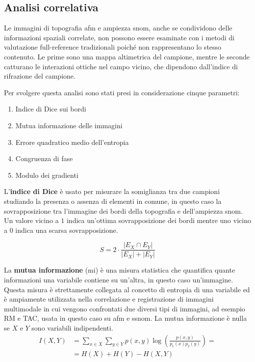 \documentclass[../main.tex]{subfiles}
\begin{document}
\subsection{Analisi correlativa}

Le immagini di topografia \acrshort{afm} e ampiezza \acrshort{snom}, anche se condividono delle informazioni spaziali correlate, non possono essere esaminate con i metodi di valutazione full-reference tradizionali poiché non rappresentano lo stesso contenuto. Le prime sono una mappa altimetrica del campione, mentre le seconde catturano le interazioni ottiche nel campo vicino, che dipendono dall'indice di rifrazione del campione.

Per svolgere questa analisi sono stati presi in considerazione cinque parametri:

\begin{enumerate}
	\itemsep0em
	\item Indice di Dice sui bordi
	\item Mutua informazione delle immagini
	\item Errore quadratico medio dell'entropia
	\item Congruenza di fase
	\item Modulo dei gradienti
\end{enumerate}

L'\textbf{indice di Dice} è usato per misurare la somiglianza tra due campioni studiando la presenza o assenza di elementi in comune, in questo caso la sovrapposizione tra l'immagine dei bordi della topografia e dell'ampiezza \acrshort{snom}. Un valore vicino a $1$ indica un'ottima sovrapposizione dei bordi mentre uno vicino a $0$ indica una scarsa sovrapposizione.\cite{carass_2020}

\begin{equation}
	S = 2\cdot \frac{\left|E_{X} \cap  E_{Y}\right|}{\left|E_{X}\right| + \left|E_{Y}\right|}
\end{equation}

La \textbf{mutua informazione} (\acrshort{mi}) è una misura statistica che quantifica quante informazioni una variabile contiene su un'altra, in questo caso un'immagine.\cite{shannon_1948} Questa misura è strettamente collegata al concetto di entropia di una variabile ed è ampiamente utilizzata nella correlazione e registrazione di immagini multimodale in cui vengono confrontati due diversi tipi di immagini,\cite{viola_1997} ad esempio RM e TAC,\cite{mclaughlin_2004, veninga_2004} usata in questo caso su \acrshort{afm} e \acrshort{ssnom}. La mutua informazione è nulla se $X$ e $Y$ sono variabili indipendenti.
\begin{equation}
	\begin{aligned}
		I(X,Y)  &= \sum_{x\in X}\sum_{y\in Y} p(x,y) \log\left(\frac{p(x,y)}{p_1(x)p_2(y)}\right) =\\
		&= H(X) + H(Y) - H(X,Y)
	\end{aligned}
\end{equation}
\end{document}
